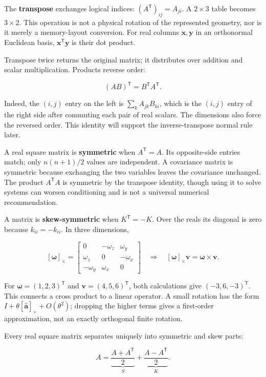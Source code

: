 The \textbf{transpose} exchanges logical indices: \((A^{\mathsf T})_{ij}=A_{ji}\). A \(2\times3\) table becomes \(3\times2\). This operation is not a physical rotation of the represented geometry, nor is it merely a memory-layout conversion. For real columns \(\mathbf x,\mathbf y\) in an orthonormal Euclidean basis, \(\mathbf x^{\mathsf T}\mathbf y\) is their dot product.

Transpose twice returns the original matrix; it distributes over addition and scalar multiplication. Products reverse order:

\[
(AB)^{\mathsf T}=B^{\mathsf T}A^{\mathsf T}.
\]

Indeed, the \((i,j)\) entry on the left is \(\sum_kA_{jk}B_{ki}\), which is the \((i,j)\) entry of the right side after commuting each pair of real scalars. The dimensions also force the reversed order. This identity will support the inverse-transpose normal rule later.

A real square matrix is \textbf{symmetric} when \(A^{\mathsf T}=A\). Its opposite-side entries match; only \(n(n+1)/2\) values are independent. A covariance matrix is symmetric because exchanging the two variables leaves the covariance unchanged. The product \(A^{\mathsf T}A\) is symmetric by the transpose identity, though using it to solve systems can worsen conditioning and is not a universal numerical recommendation.

A matrix is \textbf{skew-symmetric} when \(K^{\mathsf T}=-K\). Over the reals its diagonal is zero because \(k_{ii}=-k_{ii}\). In three dimensions,

\[
[\boldsymbol\omega]_\times=
\begin{bmatrix}0&-\omega_z&\omega_y\\\omega_z&0&-\omega_x\\-\omega_y&\omega_x&0\end{bmatrix}
\quad\Longrightarrow\quad
[\boldsymbol\omega]_\times\mathbf v=\boldsymbol\omega\times\mathbf v.
\]

For \(\boldsymbol\omega=(1,2,3)^{\mathsf T}\) and \(\mathbf v=(4,5,6)^{\mathsf T}\), both calculations give \((-3,6,-3)^{\mathsf T}\). This connects a cross product to a linear operator. A small rotation has the form \(I+\theta[\widehat{\mathbf a}]_\times+O(\theta^2)\); dropping the higher terms gives a first-order approximation, not an exactly orthogonal finite rotation.

Every real square matrix separates uniquely into symmetric and skew parts:

\[
A=\underbrace{\frac{A+A^{\mathsf T}}2}_{S}
+\underbrace{\frac{A-A^{\mathsf T}}2}_{K}.
\]

